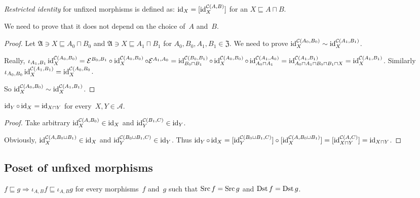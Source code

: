 \begin{defn}
\emph{Restricted identity} for unfixed morphisms is
defined as: $\operatorname{id}_X = [\operatorname{id}^{\mathcal{C}(A,B)}_X]$ for
an $X\sqsubseteq A\sqcap B$.
\end{defn}

We need to prove that it does not depend on the choice
of~$A$ and~$B$.

\begin{proof}
Let $\mathfrak{A}\ni X\sqsubseteq A_0\sqcap B_0$ and
$\mathfrak{A}\ni X\sqsubseteq A_1\sqcap B_1$ for
$A_0,B_0,A_1,B_1\in\mathfrak{Z}$. We need to prove
$\operatorname{id}^{\mathcal{C}(A_0,B_0)}_X\sim
\operatorname{id}^{\mathcal{C}(A_1,B_1)}_X$.

Really, $\iota_{A_1,B_1}\operatorname{id}^{\mathcal{C}(A_0,B_0)}_X =
\mathcal{E}^{B_0,B_1}\circ\operatorname{id}^{\mathcal{C}(A_0,B_0)}_X
\circ \mathcal{E}^{A_1,A_0} =
\operatorname{id}^{\mathcal{C}(B_0,B_1)}_{B_0\sqcap B_1}\circ
\operatorname{id}^{\mathcal{C}(A_0,B_0)}_X\circ
\operatorname{id}^{\mathcal{C}(A_1,A_0)}_{A_0\sqcap A_1} =
\operatorname{id}^{\mathcal{C}(A_1,B_1)}_{A_0\sqcap A_1\sqcap B_0\sqcap B_1\sqcap X} =
\operatorname{id}^{\mathcal{C}(A_1,B_1)}_X$.
Similarly
$\iota_{A_0,B_0}\operatorname{id}^{\mathcal{C}(A_1,B_1)}_X =
\operatorname{id}^{\mathcal{C}(A_0,B_0}_X$.

So $\operatorname{id}^{\mathcal{C}(A_0,B_0)}_X\sim
\operatorname{id}^{\mathcal{C}(A_1,B_1)}_X$.
\end{proof}

\begin{prop}
$\operatorname{id}_Y\circ\operatorname{id}_X=\operatorname{id}_{X\sqcap Y}$ for
every~$X,Y\in\mathcal{A}$.
\end{prop}

\begin{proof}
Take arbitrary $\operatorname{id}^{\mathcal{C}(A,B_0)}_X\in\operatorname{id}_X$ and
$\operatorname{id}^{\mathcal{C}(B_1,C)}_Y\in\operatorname{id}_Y$.

Obviously,
$\operatorname{id}^{\mathcal{C}(A,B_0\sqcup B_1)}_X\in\operatorname{id}_X$ and
$\operatorname{id}^{\mathcal{C}(B_0\sqcup B_1,C)}_Y\in\operatorname{id}_Y$.
Thus
$\operatorname{id}_Y\circ\operatorname{id}_X=
[\operatorname{id}^{\mathcal{C}(B_0\sqcup B_1,C)}_Y]\circ
[\operatorname{id}^{\mathcal{C}(A,B_0\sqcup B_1)}_X]=
[\operatorname{id}^{\mathcal{C}(A,C)}_{X\sqcap Y}]=
\operatorname{id}_{X\sqcap Y}$.
\end{proof}

\subsection{Poset of unfixed morphisms}

\begin{lem}
$f\sqsubseteq g\Rightarrow
\iota_{A,B}f\sqsubseteq\iota_{A,B}g$ for every
morphisms~$f$ and~$g$ such that
$\operatorname{Src} f=\operatorname{Src} g$ and $\operatorname{Dst} f=\operatorname{Dst} g$.
\end{lem}

